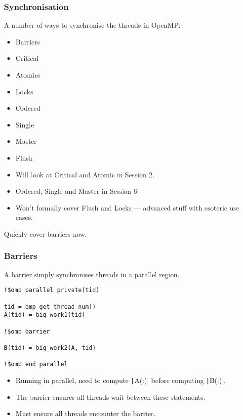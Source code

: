 \documentclass{beamer}
\begin{document}
\begin{frame}
\frametitle{Synchronisation}
A number of ways to synchronise the threads in OpenMP:
\begin{multicols}{2}
\begin{itemize}
  \item Barriers
  \item Critical
  \item Atomics
  \item Locks
  \item Ordered
  \item Single
  \item Master
  \item Flush
\end{itemize}
\end{multicols}

\vfill

\begin{itemize}
  \item Will look at Critical and Atomic in Session 2.
  \item Ordered, Single and Master in Session 6.
  \item Won't formally cover Flush and Locks --- advanced stuff with esoteric use cases.
\end{itemize}

Quickly cover barriers now.

\end{frame}

\begin{frame}[fragile]
\frametitle{Barriers}
A barrier simply synchronises threads in a parallel region.

\begin{verbatim}
!$omp parallel private(tid)

tid = omp_get_thread_num()
A(tid) = big_work1(tid)

!$omp barrier

B(tid) = big_work2(A, tid)

!$omp end parallel
\end{verbatim}

\begin{itemize}
  \item Running in parallel, need to compute \texttt|A(:)| before computing \texttt|B(:)|.
  \item The barrier ensures all threads wait between these statements.
  \item Must ensure all threads encounter the barrier.
\end{itemize}

\end{frame}
\end{document}
